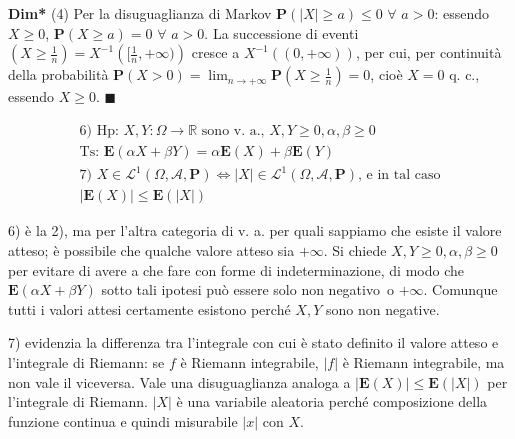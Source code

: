 \documentclass{article}
\begin{document}
\textbf{Dim*} (4) Per la disuguaglianza di Markov $\mathbf{P}\left(
\left\vert X\right\vert \geq a\right) \leq 0$ $\forall $ $a>0$: essendo $%
X\geq 0$, $\mathbf{P}\left( X\geq a\right) =0$ $\forall $ $a>0$. La
successione di eventi $\left( X\geq \frac{1}{n}\right) =X^{-1}\left( [\frac{1%
}{n},+\infty )\right) $ cresce a $X^{-1}\left( \left( 0,+\infty \right)
\right) $, per cui, per continuit\`{a} della probabilit\`{a} $\mathbf{P}%
\left( X>0\right) =\lim_{n\rightarrow +\infty }\mathbf{P}\left( X\geq \frac{1%
}{n}\right) =0$, cio\`{e} $X=0$ q. c., essendo $X\geq 0$. $\blacksquare $

\begin{gather*}
\text{6) Hp: }X,Y:\Omega \rightarrow 
\mathbb{R}
\text{ sono v. a., }X,Y\geq 0,\alpha ,\beta \geq 0 \\
\text{Ts: }\mathbf{E}\left( \alpha X+\beta Y\right) =\alpha \mathbf{E}\left(
X\right) +\beta \mathbf{E}\left( Y\right) \\
\text{7) }X\in \mathcal{L}^{1}\left( \Omega ,\mathcal{A},\mathbf{P}\right)
\Longleftrightarrow \left\vert X\right\vert \in \mathcal{L}^{1}\left( \Omega
,\mathcal{A},\mathbf{P}\right) \text{, e in tal caso} \\
\left\vert \mathbf{E}\left( X\right) \right\vert \leq \mathbf{E}\left(
\left\vert X\right\vert \right)
\end{gather*}

6) \`{e} la 2), ma per l'altra categoria di v. a. per quali sappiamo che
esiste il valore atteso; \`{e} possibile che qualche valore atteso sia $%
+\infty $. Si chiede $X,Y\geq 0,\alpha ,\beta \geq 0$ per evitare di avere a
che fare con forme di indeterminazione, di modo che $\mathbf{E}\left( \alpha
X+\beta Y\right) $ sotto tali ipotesi pu\`{o} essere solo non negativo\ o $%
+\infty $. Comunque tutti i valori attesi certamente esistono perch\'{e} $%
X,Y $ sono non negative.

7) evidenzia la differenza tra l'integrale con cui \`{e} stato definito il
valore atteso e l'integrale di Riemann: se $f$ \`{e} Riemann integrabile, $%
\left\vert f\right\vert $ \`{e} Riemann integrabile, ma non vale il
viceversa. Vale una disuguaglianza analoga a $\left\vert \mathbf{E}\left(
X\right) \right\vert \leq \mathbf{E}\left( \left\vert X\right\vert \right) $
per l'integrale di Riemann. $\left\vert X\right\vert $ \`{e} una variabile
aleatoria perch\'{e} composizione della funzione continua e quindi
misurabile $\left\vert x\right\vert $ con $X$.
\end{document}
